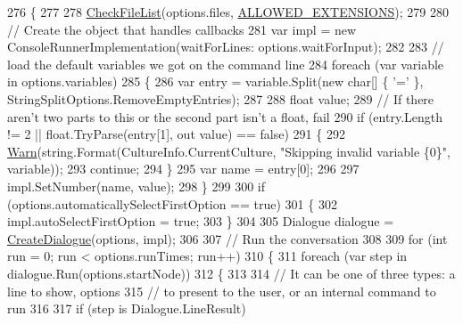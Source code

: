 \begin{DoxyCode}
276         \{
277 
278             \hyperlink{a00195_ad77564b25725a771f0fd4da430582e6f}{CheckFileList}(options.files, \hyperlink{a00195_a0979de7ea02c8c0375b8220a12e6575e}{ALLOWED\_EXTENSIONS});
279 
280             \textcolor{comment}{// Create the object that handles callbacks}
281             var impl = \textcolor{keyword}{new} ConsoleRunnerImplementation(waitForLines: options.waitForInput);
282 
283             \textcolor{comment}{// load the default variables we got on the command line}
284             \textcolor{keywordflow}{foreach} (var variable \textcolor{keywordflow}{in} options.variables)
285             \{
286                 var entry = variable.Split(\textcolor{keyword}{new} \textcolor{keywordtype}{char}[] \{ \textcolor{charliteral}{'='} \}, StringSplitOptions.RemoveEmptyEntries);
287 
288                 \textcolor{keywordtype}{float} value;
289                 \textcolor{comment}{// If there aren't two parts to this or the second part isn't a float, fail}
290                 \textcolor{keywordflow}{if} (entry.Length != 2 || \textcolor{keywordtype}{float}.TryParse(entry[1], out value) == \textcolor{keyword}{false})
291                 \{
292                     \hyperlink{a00195_a979bb6f049b6c5294f745a19e24ddd9d}{Warn}(\textcolor{keywordtype}{string}.Format(CultureInfo.CurrentCulture, \textcolor{stringliteral}{"Skipping invalid variable \{0\}"}, 
      variable));
293                     \textcolor{keywordflow}{continue};
294                 \}
295                 var name = entry[0];
296 
297                 impl.SetNumber(name, value);
298             \}
299 
300             \textcolor{keywordflow}{if} (options.automaticallySelectFirstOption == \textcolor{keyword}{true})
301             \{
302                 impl.autoSelectFirstOption = \textcolor{keyword}{true};
303             \}
304 
305             Dialogue dialogue = \hyperlink{a00195_aab244361a510cee18ad2f636d110e0d5}{CreateDialogue}(options, impl);
306 
307             \textcolor{comment}{// Run the conversation}
308 
309             \textcolor{keywordflow}{for} (\textcolor{keywordtype}{int} run = 0; run < options.runTimes; run++)
310             \{
311                 \textcolor{keywordflow}{foreach} (var step \textcolor{keywordflow}{in} dialogue.Run(options.startNode))
312                 \{
313 
314                     \textcolor{comment}{// It can be one of three types: a line to show, options}
315                     \textcolor{comment}{// to present to the user, or an internal command to run}
316 
317                     \textcolor{keywordflow}{if} (step is Dialogue.LineResult)

\end{DoxyCode}

